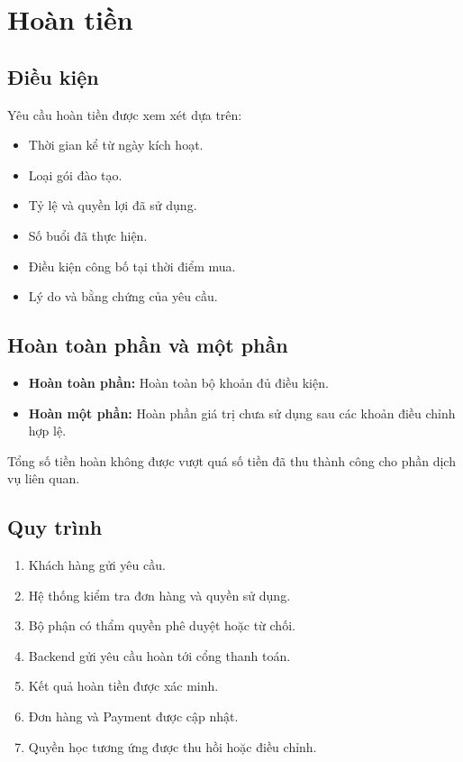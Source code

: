 \documentclass[12pt,a4paper]{article}
\begin{document}
\section{Hoàn tiền}

\subsection{Điều kiện}

Yêu cầu hoàn tiền được xem xét dựa trên:

\begin{itemize}
    \item Thời gian kể từ ngày kích hoạt.
    \item Loại gói đào tạo.
    \item Tỷ lệ và quyền lợi đã sử dụng.
    \item Số buổi đã thực hiện.
    \item Điều kiện công bố tại thời điểm mua.
    \item Lý do và bằng chứng của yêu cầu.
\end{itemize}

\subsection{Hoàn toàn phần và một phần}

\begin{itemize}
    \item \textbf{Hoàn toàn phần:} Hoàn toàn bộ khoản đủ điều kiện.
    \item \textbf{Hoàn một phần:} Hoàn phần giá trị chưa sử dụng
    sau các khoản điều chỉnh hợp lệ.
\end{itemize}

Tổng số tiền hoàn không được vượt quá số tiền đã thu thành công
cho phần dịch vụ liên quan.

\subsection{Quy trình}

\begin{enumerate}
    \item Khách hàng gửi yêu cầu.
    \item Hệ thống kiểm tra đơn hàng và quyền sử dụng.
    \item Bộ phận có thẩm quyền phê duyệt hoặc từ chối.
    \item Backend gửi yêu cầu hoàn tới cổng thanh toán.
    \item Kết quả hoàn tiền được xác minh.
    \item Đơn hàng và Payment được cập nhật.
    \item Quyền học tương ứng được thu hồi hoặc điều chỉnh.
\end{enumerate}
\end{document}
